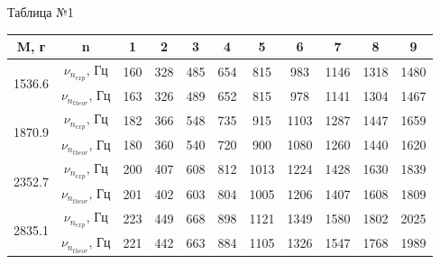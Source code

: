 \documentclass[a4paper,12pt]{article} %
\begin{document}
\begin{center}
Таблица №1\\
\begin{tabular}{|c|c|c|c|c|c|c|c|c|c|c|}
\hline
M, г                             & n  & 1   & 2   & 3   & 4   & 5    & 6    & 7    & 8    & 9    \\ \hline
\multirow{2}{*}{1536.6}           & $\nu_{n_{exp}}\text{, Гц}$ & 160 & 328 & 485 & 654 & 815  & 983  & 1146 & 1318 & 1480 \\ \cline{2-11} 
                              & $\nu_{n_{theor}}\text{, Гц}$ & 163 & 326 & 489 & 652 & 815  & 978  & 1141 & 1304 & 1467 \\ \hline
\multirow{2}{*}{1870.9} & $\nu_{n_{exp}}\text{, Гц}$ & 182 & 366 & 548 & 735 & 915  & 1103 & 1287 & 1447 & 1659 \\ \cline{2-11} 
                              & $\nu_{n_{theor}}\text{, Гц}$ & 180 & 360 & 540 & 720 & 900  & 1080 & 1260 & 1440 & 1620 \\ \hline
\multirow{2}{*}{2352.7}          & $\nu_{n_{exp}}\text{, Гц}$ & 200 & 407 & 608 & 812 & 1013 & 1224 & 1428 & 1630 & 1839 \\ \cline{2-11} 
                              & $\nu_{n_{theor}}\text{, Гц}$ & 201 & 402 & 603 & 804 & 1005 & 1206 & 1407 & 1608 & 1809 \\ \hline
\multirow{2}{*}{2835.1}          & $\nu_{n_{exp}}\text{, Гц}$ & 223 & 449 & 668 & 898 & 1121 & 1349 & 1580 & 1802 & 2025 \\ \cline{2-11} 
                              & $\nu_{n_{theor}}\text{, Гц}$ & 221 & 442 & 663 & 884 & 1105 & 1326 & 1547 & 1768 & 1989 \\ \hline
\end{tabular}
\end{center}
\end{document}
